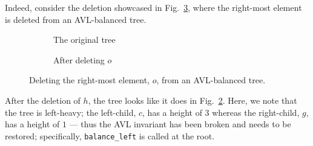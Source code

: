 \documentclass[acmsmall, authorversion, nonacm, overload]{acmart}
\begin{document}
Indeed, consider the deletion showcased in Fig.\ \ref{fig:deletion_fig},
where the right-most element is deleted from an AVL-balanced tree.
\begin{figure}[!ht]
  \centering
  \begin{subfigure}{0.5\textwidth}
    \centering
  \caption{The original tree%
  \label{fig:before_deletion}}
  \end{subfigure}%
  \begin{subfigure}{0.5\textwidth}
    \centering
  \caption{After deleting $o$%
  \label{fig:after_deletion}}
  \end{subfigure}
  \caption{Deleting the right-most element, $o$, from an AVL-balanced tree.%
  \label{fig:deletion_fig}}
\end{figure}

After the deletion of $h$, the tree looks like it does in Fig.\ \ref{fig:after_deletion}.
Here, we note that the tree is left-heavy; the left-child, $c$, has a height of $3$ whereas the right-child, $g$,
has a height of $1$ --- thus the AVL invariant has been broken and needs to be restored;
specifically, \verb|balance_left| is called at the root.
\end{document}
